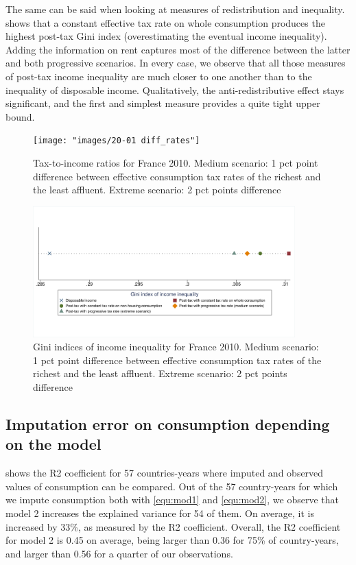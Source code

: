 The same can be said when looking at measures of redistribution and inequality.  shows that a constant effective tax rate on whole consumption produces the highest post-tax Gini index (overestimating the eventual income inequality). Adding the information on rent captures most of the difference between the latter and both progressive scenarios. In every case, we observe that all those measures of post-tax income inequality are much closer to one another than to the inequality of disposable income. Qualitatively, the anti-redistributive effect stays significant, and the first and simplest measure provides a quite tight upper bound.

\begin{figure}[!ht]
\centering
\texttt{[image: "images/20-01 diff\_rates"]}
\caption{Tax-to-income ratios for France 2010. Medium scenario: 1 pct point difference between effective consumption tax rates of the richest and the least affluent. Extreme scenario: 2 pct points difference}
\label{fig:diff_rates}  
\end{figure}

\begin{figure}[!h]
\centering
\includegraphics[width=0.90\textwidth]{"images/19-11_fr10_sum_diff_rates"}
\caption{Gini indices of income inequality for France 2010. Medium scenario: 1 pct point difference between effective consumption tax rates of the richest and the least affluent. Extreme scenario: 2 pct points difference}
\label{fig:sum_diff_rates}  
\end{figure}

\subsection{Imputation error on consumption depending on the model}
\label{sec:compare_models}
 shows the R2 coefficient for 57 countries-years where imputed and observed values of consumption can be compared. Out of the 57 country-years for which we impute consumption both with \eqref{equ:mod1} and \eqref{equ:mod2}, we observe that model 2 increases the explained variance for 54 of them. On average, it is increased by 33\%, as measured by the R2 coefficient. Overall, the R2 coefficient for model 2 is 0.45 on average, being larger than 0.36 for 75\% of country-years, and larger than 0.56 for a quarter of our observations.

